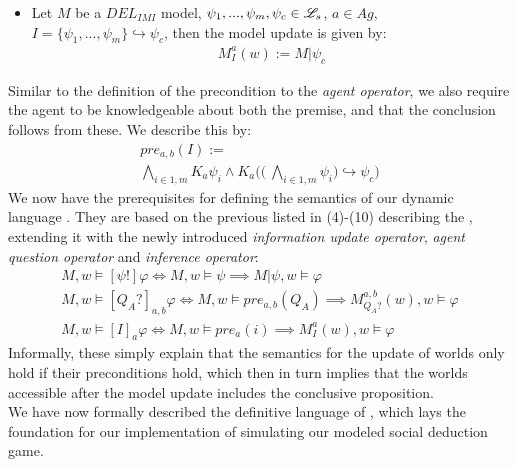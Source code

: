 \begin{itemize}
	\item Let $M$ be a $DEL_{IMI}$ model, $\psi_1,...,\psi_m, \psi_c \in \mathscr{L}_s$, $a\in Ag$, $I=\{\psi_1,...,\psi_m\} \hookrightarrow \psi_c$, then the model update is given by: 
	\begin{gather}
		M^a_I(w) := M|\psi_c
	\end{gather}
\end{itemize} 
Similar to the definition of the precondition to the \textit{agent operator}, we also require the agent to be knowledgeable about both the premise, and that the conclusion follows from these. We describe this by:
\begin{gather}
	\nonumber pre_{a,b}(I) := \\ \bigwedge\limits_{i\in1,m}K_a\psi_i \land K_a\Biggl(\Biggl(\:\bigwedge\limits_{i\in 1,m}\psi_i\Biggr) \hookrightarrow \psi_c \Biggr)
\end{gather}
We now have the prerequisites for defining the semantics of our dynamic language \dynlang. They are based on the previous listed in (4)-(10) describing the \staticlang, extending it with the newly introduced \textit{information update operator}, \textit{agent question operator} and \textit{inference operator}:
\begin{gather}
	M, w \models [\psi!]\varphi \iff M, w \models \psi \implies M|\psi, w \models \varphi \\
	M, w \models [Q_A?]_{a,b}\varphi \iff M, w \models pre_{a,b}(Q_A) \implies M^{a,b}_{Q_A?}(w), w \models \varphi \\
	M, w \models [I]_a\varphi \iff M, w \models pre_a(i) \implies M^a_I(w), w \models \varphi
\end{gather}
Informally, these simply explain that the semantics for the update of worlds only hold if their preconditions hold, which then in turn implies that the worlds accessible after the model update includes the conclusive proposition. \\

We have now formally described the definitive language of \dynlang, which lays the foundation for our  implementation of simulating our modeled social deduction game. 
